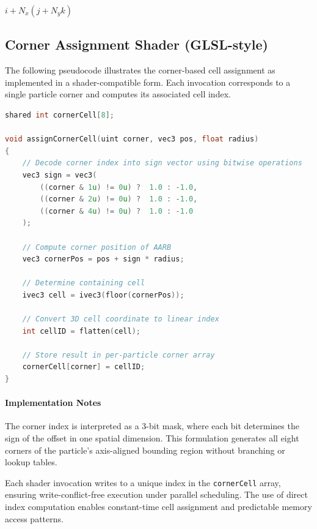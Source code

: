 \begin{algorithm}
\caption{Flattening a 3D Cell Coordinate to a 1D Index}
\begin{algorithmic}[1]

    \State \Return $i + N_x \left( j + N_y k \right)$
\EndFunction

\end{algorithmic}
\end{algorithm}

\subsection{Corner Assignment Shader (GLSL-style)}

The following pseudocode illustrates the corner-based cell assignment as implemented in a shader-compatible form. Each invocation corresponds to a single particle corner and computes its associated cell index.

\begin{lstlisting}[language=C++, caption={Corner-to-cell mapping in GLSL/Vulkan-style pseudocode}]
shared int cornerCell[8];

void assignCornerCell(uint corner, vec3 pos, float radius)
{
    // Decode corner index into sign vector using bitwise operations
    vec3 sign = vec3(
        ((corner & 1u) != 0u) ?  1.0 : -1.0,
        ((corner & 2u) != 0u) ?  1.0 : -1.0,
        ((corner & 4u) != 0u) ?  1.0 : -1.0
    );

    // Compute corner position of AARB
    vec3 cornerPos = pos + sign * radius;

    // Determine containing cell
    ivec3 cell = ivec3(floor(cornerPos));

    // Convert 3D cell coordinate to linear index
    int cellID = flatten(cell);

    // Store result in per-particle corner array
    cornerCell[corner] = cellID;
}
\end{lstlisting}

\paragraph{Implementation Notes}

The corner index is interpreted as a 3-bit mask, where each bit determines the sign of the offset in one spatial dimension. This formulation generates all eight corners of the particle’s axis-aligned bounding region without branching or lookup tables.

Each shader invocation writes to a unique index in the \texttt{cornerCell} array, ensuring write-conflict-free execution under parallel scheduling. The use of direct index computation enables constant-time cell assignment and predictable memory access patterns.